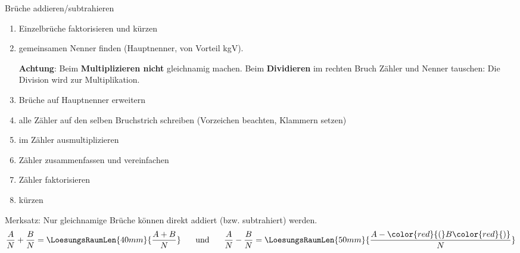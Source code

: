 

\begin{rezept}{Brüche addieren/subtrahieren}{}\label{bruchtermeRezept}
\begin{enumerate}
	\item Einzelbrüche faktorisieren und kürzen
	\item gemeinsamen Nenner finden (Hauptnenner, von Vorteil
	kgV).

  \textbf{Achtung}: Beim \textbf{Multiplizieren nicht}
	gleichnamig machen. Beim \textbf{Dividieren} im rechten Bruch Zähler
	und Nenner tauschen: Die Division wird zur Multiplikation.
	\item Brüche auf Hauptnenner erweitern
	\item alle Zähler auf den selben Bruchstrich schreiben (Vorzeichen beachten, Klammern setzen)
	\item im Zähler ausmultiplizieren
	\item Zähler zusammenfassen und vereinfachen
	\item Zähler faktorisieren
	\item kürzen
\end{enumerate}
\end{rezept}


\begin{gesetz}{}{}
Merksatz: Nur gleichnamige Brüche können direkt addiert (bzw. subtrahiert)
werden.
$$\frac{A}{N} + \frac{B}{N} = \LoesungsRaumLen{40mm}{\frac{A+B}{N}} \hspace{5mm} \text{
und } \hspace{5mm} \frac{A}{N} - \frac{B}{N} = \LoesungsRaumLen{50mm}{\frac{A-{\color{red}{(}}B{\color{red}{)}}}{N}} $$
\end{gesetz}



